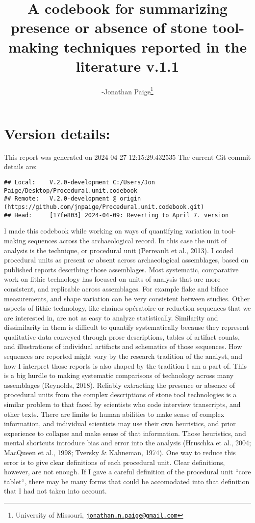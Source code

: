\documentclass[
]{article}
\title{A codebook for summarizing presence or absence of stone
tool-making techniques reported in the literature v.1.1}
\author{-Jonathan Paige\footnote{University of Missouri,
  \href{mailto:jonathan.n.paige@gmail.com}{\nolinkurl{jonathan.n.paige@gmail.com}}}}
\date{}
\begin{document}
\maketitle

{
\setcounter{tocdepth}{3}
\tableofcontents
}
\hypertarget{version-details}{%
\section{Version details:}\label{version-details}}

This report was generated on 2024-04-27 12:15:29.432535 The current Git
commit details are:

\begin{verbatim}
## Local:    V.2.0-development C:/Users/Jon Paige/Desktop/Procedural.unit.codebook
## Remote:   V.2.0-development @ origin (https://github.com/jnpaige/Procedural.unit.codebook.git)
## Head:     [17fe803] 2024-04-09: Reverting to April 7. version
\end{verbatim}

I made this codebook while working on ways of quantifying variation in
tool-making sequences across the archaeological record. In this case the
unit of analysis is the technique, or procedural unit (Perreault et al.,
2013). I coded procedural units as present or absent across
archaeological assemblages, based on published reports describing those
assemblages. Most systematic, comparative work on lithic technology has
focused on units of analysis that are more consistent, and replicable
across assemblages. For example flake and biface measurements, and shape
variation can be very consistent between studies. Other aspects of
lithic technology, like chaînes opératoire or reduction sequences that
we are interested in, are not as easy to analyze statistically.
Similarity and dissimilarity in them is difficult to quantify
systematically because they represent qualitative data conveyed through
prose descriptions, tables of artifact counts, and illustrations of
individual artifacts and schematics of those sequences. How sequences
are reported might vary by the research tradition of the analyst, and
how I interpret those reports is also shaped by the tradition I am a
part of. This is a big hurdle to making systematic comparisons of
technology across many assemblages (Reynolds, 2018). Reliably extracting
the presence or absence of procedural units from the complex
descriptions of stone tool technologies is a similar problem to that
faced by scientists who code interview transcripts, and other texts.
There are limits to human abilities to make sense of complex
information, and individual scientists may use their own heuristics, and
prior experience to collapse and make sense of that information. Those
heuristics, and mental shortcuts introduce bias and error into the
analysis (Hruschka et al., 2004; MacQueen et al., 1998; Tversky \&
Kahneman, 1974). One way to reduce this error is to give clear
definitions of each procedural unit. Clear definitions, however, are not
enough. If I gave a careful definition of the procedural unit ``core
tablet``, there may be many forms that could be accomodated into that
definition that I had not taken into account.
\end{document}
